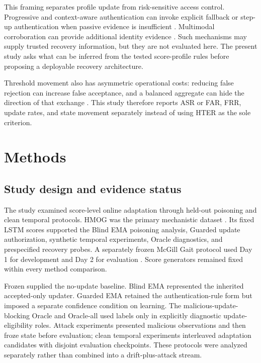 \documentclass[technologies,article,submit,moreauthors]{Definitions/mdpi}
\begin{document}
This framing separates profile update from risk-sensitive access control. Progressive and context-aware authentication can invoke explicit fallback or step-up authentication when passive evidence is insufficient \cite{Riva2012ProgressiveAuthentication,Hayashi2013CASA,Crawford2013ContinuousFramework}. Multimodal corroboration can provide additional identity evidence \cite{Ross2003InformationFusion}. Such mechanisms may supply trusted recovery information, but they are not evaluated here. The present study asks what can be inferred from the tested score-profile rules before proposing a deployable recovery architecture.

Threshold movement also has asymmetric operational costs: reducing false rejection can increase false acceptance, and a balanced aggregate can hide the direction of that exchange \cite{Jain2004BiometricRecognition,Joshi2020AdaptiveThreshold}. This study therefore reports ASR or FAR, FRR, update rates, and state movement separately instead of using HTER as the sole criterion.

\section{Methods}\label{sec:methods}

\subsection{Study design and evidence status}\label{sec:study-design-and-evidence-status}

The study examined score-level online adaptation through held-out poisoning and clean temporal protocols. HMOG was the primary mechanistic dataset \cite{Sitova2016HMOG}. Its fixed LSTM scores supported the Blind EMA poisoning analysis, Guarded update authorization, synthetic temporal experiments, Oracle diagnostics, and prespecified recovery probes. A separately frozen McGill Gait protocol used Day 1 for development and Day 2 for evaluation \cite{Frank2010McGillGaitDataset}. Score generators remained fixed within every method comparison.

Frozen supplied the no-update baseline. Blind EMA represented the inherited accepted-only updater. Guarded EMA retained the authentication-rule form but imposed a separate confidence condition on learning. The malicious-update-blocking Oracle and Oracle-all used labels only in explicitly diagnostic update-eligibility roles. Attack experiments presented malicious observations and then froze state before evaluation; clean temporal experiments interleaved adaptation candidates with disjoint evaluation checkpoints. These protocols were analyzed separately rather than combined into a drift-plus-attack stream.
\end{document}

